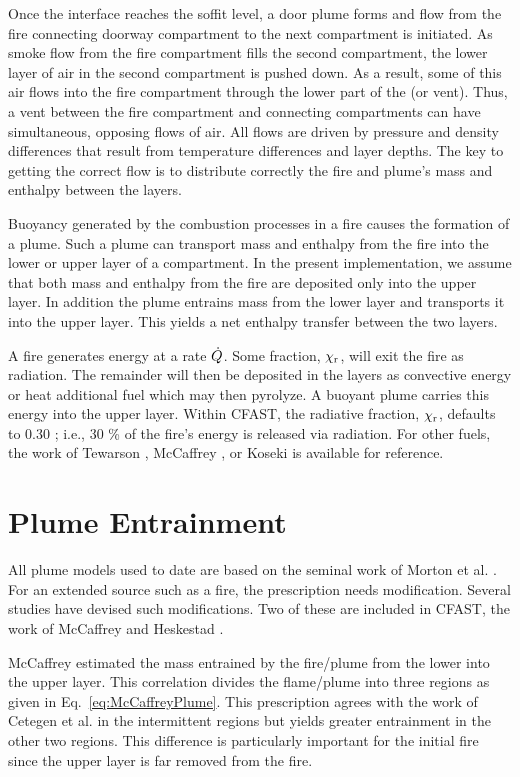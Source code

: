 Once the interface reaches the soffit level, a door plume forms and flow from the fire connecting doorway compartment to the next compartment is initiated.  As smoke flow from the fire compartment fills the second compartment, the lower layer of air in the second compartment is pushed down. As a result, some of this air flows into the fire compartment through the lower part of the (or vent).  Thus, a vent between the fire compartment and connecting compartments can have simultaneous, opposing flows of air.  All flows are driven by pressure and density differences that result from temperature differences and layer depths. The key to getting the correct flow is to distribute correctly the fire and plume's mass and enthalpy between the layers.

Buoyancy generated by the combustion processes in a fire causes the formation of a plume. Such a plume can transport mass and enthalpy from the fire into the lower or upper layer of a compartment.  In the present implementation, we assume that both mass and enthalpy from the fire are deposited only into the upper layer.  In addition the plume entrains mass from the lower layer and transports it into the upper layer.  This yields a net enthalpy transfer between the two layers.

A fire generates energy at a rate $\dot{Q}$.  Some fraction, $\chi_{\rm r}$, will exit the fire as radiation.  The remainder will then be deposited in the layers as convective energy or heat additional fuel which may then pyrolyze. A buoyant plume carries this energy into the upper layer. Within CFAST, the radiative fraction, $\chi_{\rm r}$, defaults to 0.30 \cite{Drysdale:1985}; i.e., 30 \% of the fire's energy is released via radiation.  For other fuels, the work of Tewarson \cite{Tewarson:1978}, McCaffrey \cite{McCaffrey:1982}, or Koseki \cite{Koseki:1989} is available for reference.  

\section{Plume Entrainment}

All plume models used to date are based on the seminal work of Morton et al. \cite{Morton:1956}. For an extended source such as a fire, the prescription needs modification. Several studies have devised such modifications. Two of these are included in CFAST, the work of McCaffrey \cite{McCaffrey:1983} and Heskestad \cite{Heskestad:1984}.

McCaffrey \cite{McCaffrey:1983} estimated the mass entrained by the fire/plume from the lower into the upper layer. This correlation divides the flame/plume into three regions as given in Eq.~\ref{eq:McCaffreyPlume}.  This prescription agrees with the work of Cetegen et al. \cite{Cetegen:1982, Cetegen:1984} in the intermittent regions but yields greater entrainment in the other two regions.  This difference is particularly important for the initial fire since the upper layer is far removed from the fire.

